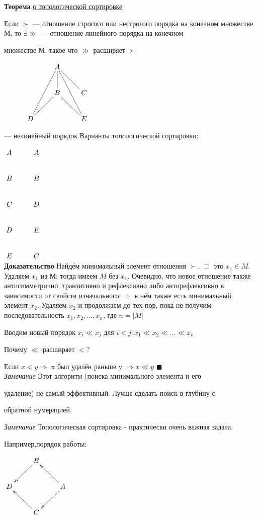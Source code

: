 \documentclass[a4paper, 12pt] {article}
\begin{document}
	\textbf{Теорема} \underline{о топологической сортировке}
	
	Если $\succ$ --- отношение строгого или нестрогого порядка на конечном множестве М, то $\exists \gg$ --- отношение линейного порядка на конечном 
	
	множестве М, такое что $\gg$ расширяет $\succ$
	
	$\xymatrix{
		& & A \ar@{-}[d] \ar@{-}[ddl] \ar@{-}[ddr] \ar@{-}[rd]  \\ 
		& & B \ar@{-}[dl] \ar@{-}[dr] & C \\
		& D & & E \\
	}$
	
	--- нелинейный порядок
	\newpage
	Варианты топологической сортировки:
	
	$\xymatrix{
		A & A\\
		B & B\\
		C & D\\
		D & E\\
		E & C\\
	}$\\

	
	\textbf{Доказательство}
	Найдём минимальный элемент отношения $\succ$. $\sqsupset$ это $x_{1} \in M$. Удаляем $x_{1}$ из М: тогда имеем $M \text{ без }x_{1}$. Очевидно, что новое отношение также антисимметрично, транзитивно и рефлексивно либо антирефлексивно в зависимости от свойств изначального $\Rightarrow$ в нём также есть минимальный элемент $x_{2}$. Удаляем $x_{2}$ и продолжаем до тех пор, пока не получим последовательность $x_{1}, x_{2}, \dots, x_{n}$, где $n=|M|$ 
	
	Вводим новый порядок $ x_{i} \ll x_{j}$ для $i < j: x_{1} \ll x_{2} \ll \dots \ll x_{n}$
	
	Почему $\ll$ расширяет $<$?
	
	Если $x < y \Rightarrow $ x был удалён раньше y $\Rightarrow x \ll y $  $\blacksquare$\\
	
	
	\textit{Замечание}
	Этот алгоритм (поиска минимального элемента и его 
	
	удаление) не самый эффективный. Лучше сделать поиск в глубину с 
	
	обратной нумерацией.
	
	\textit{Замечание}
	Топологическая сортировка - практически очень важная задача.
	
	Например,порядок работы: 
	
	$\xymatrix{
		& B \ar[ld]\\
		D & & A \ar[ld] \ar[lu]\\
		& C \ar[lu] \\
	}$
	
\end{document}
